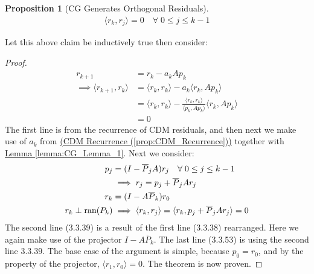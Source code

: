 \documentclass[]{article}
\theoremstyle{definition}
\newtheorem{prop}{Proposition}[section]  %
\begin{document}
            \begin{prop}[CG Generates Orthogonal Residuals]\label{prop:CG_Generates_Orthogonal_Residuals}
                \begin{align}
                    \langle r_k , r_j \rangle = 0 \quad \forall\; 0 \le j \le k - 1 
                \end{align}
            \end{prop}
            \noindent
            Let this above claim be inductively true then consider: 
            \begin{proof}
                \begin{align}
                    r_{k + 1} &= r_k - a_kAp_k
                    \\
                    \implies 
                    \langle r_{k + 1}, r_k\rangle &= \langle r_k, r_k\rangle - 
                    a_k \langle r_k, Ap_k\rangle
                    \\
                    &= \langle r_k, r_k\rangle - 
                    \frac{\langle r_k, r_k\rangle}{\langle p_k, Ap_k\rangle}
                    \langle r_k, Ap_k\rangle
                    \\
                    &= 
                    0
                \end{align}
                The first line is from the recurrence of CDM residuals, and then next we make use of $a_k$ from \hyperref[prop:CDM_Recurrence]{(CDM Recurrence (\ref*{prop:CDM_Recurrence}))} together with \hyperref[lemma:CG_Lemma_1]{Lemma \ref*{lemma:CG_Lemma_1}}. Next we consider: 
                \begin{align}
                    p_j &= (I - \overline{P}_jA)r_j \quad \forall\; 0\le j \le k - 1
                    \\
                    \hspace{1.1em} & \implies r_j = p_j + \overline{P}_jAr_j
                    \\
                    r_k &= (I - A\overline{P}_k)r_0
                    \\
                    r_k\perp \text{ran}(P_k) & \implies 
                    \langle r_k, r_j\rangle =\langle r_k, p_j + \overline{P}_jAr_j\rangle = 0
                \end{align}
                The second line (3.3.39) is a result of the first line (3.3.38) rearranged. Here we again make use of the projector $I - A \overline{P}_k$. The last line (3.3.53) is using the second line $3.3.39$. The base case of the argument is simple, because $p_0 = r_0$, and by the property of the projector, $\langle r_1, r_0\rangle = 0$. The theorem is now proven. 
            \end{proof}
\end{document}

